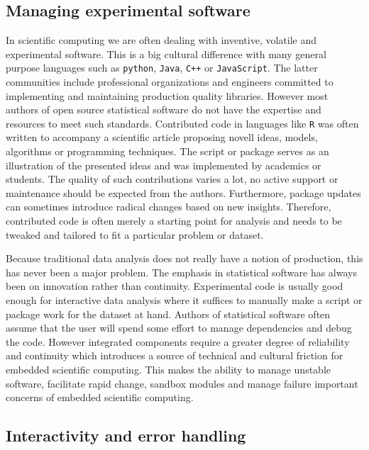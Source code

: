 \documentclass{article}
\begin{document}
\subsection{Managing experimental software}

In scientific computing we are often dealing with inventive, volatile and experimental  software. This is a big cultural difference with many general purpose languages such as \texttt{python}, \texttt{Java}, \texttt{C++} or \texttt{JavaScript}. The latter communities include professional organizations and engineers committed to implementing and maintaining production quality libraries. However most authors of open source statistical software do not have the expertise and resources to meet such standards. Contributed code in languages like \texttt{R} was often written to accompany a scientific article proposing novell ideas, models, algorithms or programming techniques. The script or package serves as an illustration of the presented ideas and was implemented by academics or students. The quality of such contributions varies a lot, no active support or maintenance should be expected from the authors. Furthermore, package updates can sometimes introduce radical changes based on new insights. Therefore, contributed code is often merely a starting point for analysis and needs to be tweaked and tailored to fit a particular problem or dataset.

Because traditional data analysis does not really have a notion of production, this has never been a major problem. The emphasis in statistical software has always been on innovation rather than continuity. Experimental code is usually good enough for interactive data analysis where it suffices to manually make a script or package work for the dataset at hand.
Authors of statistical software often assume that the user will spend some effort to manage dependencies and debug the code. However integrated components require a greater degree of reliability and continuity which introduces a source of technical and cultural friction for embedded scientific computing. 
This makes the ability to manage unstable software, facilitate rapid change, sandbox modules and manage failure important concerns of embedded scientific computing.

\subsection{Interactivity and error handling}
\end{document}
